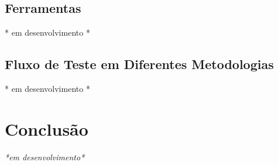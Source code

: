 \documentclass[
	12pt,				%
	openright,			%
	oneside,			%
	a4paper,			%
	english,			%
	brazil,				%
	]{abntex2}
\begin{document}
\section{Ferramentas}
* em desenvolvimento *

\section{Fluxo de Teste em Diferentes Metodologias}
* em desenvolvimento *

% 

\chapter*[Conclusão]{Conclusão}

\emph{*em desenvolvimento*}


\postextual


%


%
%


\printindex
\end{document}
